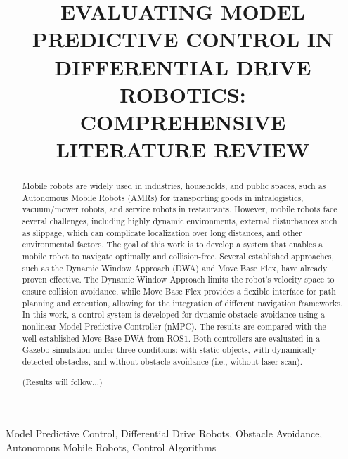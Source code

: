 \documentclass[conference]{IEEEtran}
\begin{document}

\pagestyle{fancy}
\fancyhf{}
\rfoot{\thepage} %

\title{ EVALUATING MODEL PREDICTIVE CONTROL IN DIFFERENTIAL DRIVE ROBOTICS: \\ COMPREHENSIVE LITERATURE REVIEW }

\author{
}


\maketitle

\begin{abstract}
    Mobile robots are widely used in industries, households, and public spaces, such as Autonomous
    Mobile Robots (AMRs) for transporting goods in intralogistics, vacuum/mower robots, and service
    robots in restaurants. However, mobile robots face several challenges, including highly dynamic
    environments, external disturbances such as slippage, which can complicate localization over 
    long distances, and other environmental factors. The goal of this work is to develop a system that 
    enables a mobile robot to navigate optimally and collision-free. Several established approaches,
    such as the Dynamic Window Approach (DWA) and Move Base Flex, have already proven effective.
    The Dynamic Window Approach limits the robot's velocity space to ensure collision avoidance, while
    Move Base Flex provides a flexible interface for path planning and execution, allowing for the 
    integration of different navigation frameworks. In this work, a control system is developed for 
    dynamic obstacle avoidance using a nonlinear Model Predictive Controller (nMPC). The results are 
    compared with the well-established Move Base DWA from ROS1. Both controllers are evaluated in a 
    Gazebo simulation under three conditions: with static objects, with dynamically detected obstacles, 
    and without obstacle avoidance (i.e., without laser scan).

    (Results will follow...)
\end{abstract}

\begin{IEEEkeywords}
Model Predictive Control, Differential Drive Robots, Obstacle Avoidance, Autonomous Mobile Robots, Control Algorithms
\end{IEEEkeywords}
\end{document}
